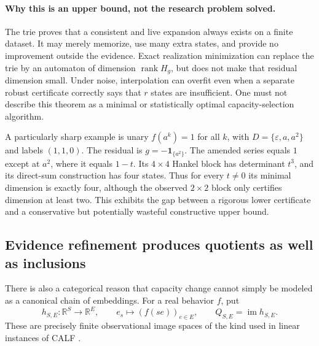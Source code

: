 \documentclass[11pt]{article}
\theoremstyle{definition}
\theoremstyle{remark}
\begin{document}
\paragraph{Why this is an upper bound, not the research problem solved.}
The trie proves that a consistent and live expansion always exists on a
finite dataset. It may merely memorize, use many extra states, and provide
no improvement outside the evidence. Exact realization minimization can
replace the trie by an automaton of dimension $\operatorname{rank}H_g$,
but does not make that residual dimension small. Under noise, interpolation
can overfit even when a separate robust certificate correctly says that
$r$ states are insufficient. One must not describe this theorem as a
minimal or statistically optimal capacity-selection algorithm.

A particularly sharp example is unary $f(a^k)=1$ for all $k$, with
$D=\{\varepsilon,a,a^2\}$ and labels $(1,1,0)$. The residual is
$g=-\mathbf1_{\{a^2\}}$. The amended series equals $1$ except at
$a^2$, where it equals $1-t$. Its $4\times4$ Hankel block has determinant
$t^3$, and its direct-sum construction has four states. Thus for every
$t\ne0$ its minimal dimension is exactly four, although the observed
$2\times2$ block only certifies dimension at least two. This exhibits the
gap between a rigorous lower certificate and a conservative but potentially
wasteful constructive upper bound.

\subsection{Evidence refinement produces quotients as well as inclusions}

There is also a categorical reason that capacity change cannot simply be
modeled as a canonical chain of embeddings. For a real behavior $f$, put
\[
 h_{S,E}:\mathbb R^S\longrightarrow\mathbb R^E,
 \qquad e_s\longmapsto(f(se))_{e\in E},\qquad
 Q_{S,E}=\operatorname{im}h_{S,E}.
\]
These are precisely finite observational image spaces of the kind used in
linear instances of CALF \cite{ce:calf2017}.
\end{document}
